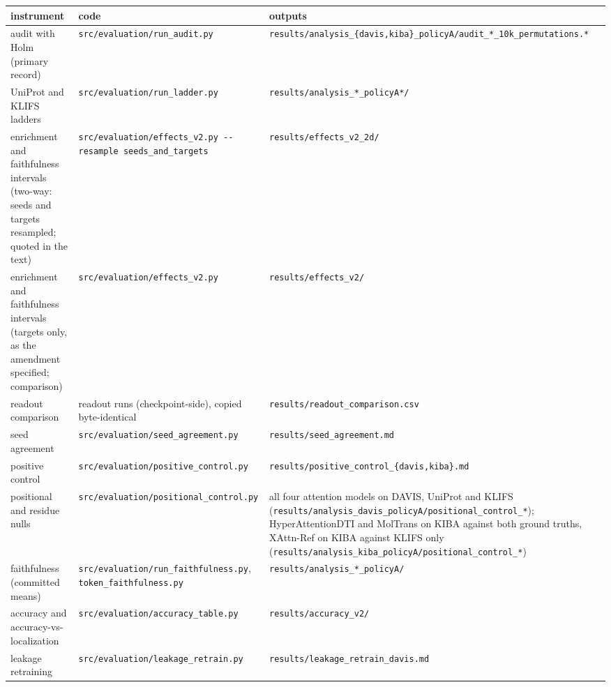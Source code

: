 \documentclass[
  10pt,
]{article}
\begin{document}
\begin{longtable}[]{@{}
  >{\raggedright\arraybackslash}p{}
  >{\raggedright\arraybackslash}p{}
  >{\raggedright\arraybackslash}p{}@{}}
\toprule\noalign{}
\begin{minipage}[b]{\linewidth}\raggedright
instrument
\end{minipage} & \begin{minipage}[b]{\linewidth}\raggedright
code
\end{minipage} & \begin{minipage}[b]{\linewidth}\raggedright
outputs
\end{minipage} \\
\midrule\noalign{}
\endhead
\bottomrule\noalign{}
\endlastfoot
audit with Holm (primary record) & \texttt{src/evaluation/run\_audit.py} & \texttt{results/analysis\_\{davis,kiba\}\_policyA/audit\_*\_10k\_permutations.*} \\
UniProt and KLIFS ladders & \texttt{src/evaluation/run\_ladder.py} & \texttt{results/analysis\_*\_policyA*/} \\
enrichment and faithfulness intervals (two-way: seeds and targets resampled; quoted in the text) & \texttt{src/evaluation/effects\_v2.py\ -\/-resample\ seeds\_and\_targets} & \texttt{results/effects\_v2\_2d/} \\
enrichment and faithfulness intervals (targets only, as the amendment specified; comparison) & \texttt{src/evaluation/effects\_v2.py} & \texttt{results/effects\_v2/} \\
readout comparison & readout runs (checkpoint-side), copied byte-identical & \texttt{results/readout\_comparison.csv} \\
seed agreement & \texttt{src/evaluation/seed\_agreement.py} & \texttt{results/seed\_agreement.md} \\
positive control & \texttt{src/evaluation/positive\_control.py} & \texttt{results/positive\_control\_\{davis,kiba\}.md} \\
positional and residue nulls & \texttt{src/evaluation/positional\_control.py} & all four attention models on DAVIS, UniProt and KLIFS (\texttt{results/analysis\_davis\_policyA/positional\_control\_*}); HyperAttentionDTI and MolTrans on KIBA against both ground truths, XAttn-Ref on KIBA against KLIFS only (\texttt{results/analysis\_kiba\_policyA/positional\_control\_*}) \\
faithfulness (committed means) & \texttt{src/evaluation/run\_faithfulness.py}, \texttt{token\_faithfulness.py} & \texttt{results/analysis\_*\_policyA/} \\
accuracy and accuracy-vs-localization & \texttt{src/evaluation/accuracy\_table.py} & \texttt{results/accuracy\_v2/} \\
leakage retraining & \texttt{src/evaluation/leakage\_retrain.py} & \texttt{results/leakage\_retrain\_davis.md} \\
\end{longtable}
\end{document}
